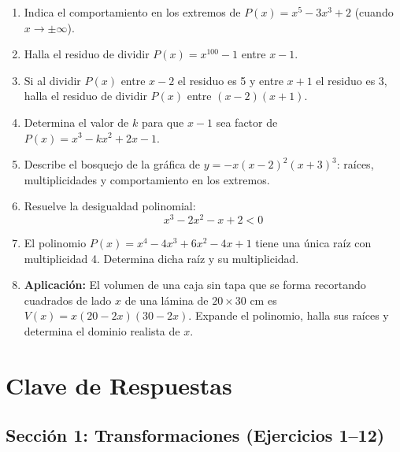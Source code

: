 \documentclass[12pt, letterpaper]{article}
\begin{document}
\begin{enumerate}[resume=ejercicios, leftmargin=*]
  \item \facil{} Indica el comportamiento en los extremos de $P(x) = x^5 - 3x^3 + 2$ (cuando $x \to \pm \infty$).

  \item \medio{} Halla el residuo de dividir $P(x) = x^{100} - 1$ entre $x - 1$.

  \item \medio{} Si al dividir $P(x)$ entre $x - 2$ el residuo es 5 y entre $x + 1$ el residuo es 3, halla el residuo de dividir $P(x)$ entre $(x - 2)(x + 1)$.

  \item \medio{} Determina el valor de $k$ para que $x - 1$ sea factor de $P(x) = x^3 - kx^2 + 2x - 1$.

  \item \dificil{} Describe el bosquejo de la gráfica de $y = -x(x - 2)^2 (x + 3)^3$: raíces, multiplicidades y comportamiento en los extremos.

  \item \dificil{} Resuelve la desigualdad polinomial:
        $$x^3 - 2x^2 - x + 2 < 0$$

  \item \muyDificil{} El polinomio $P(x) = x^4 - 4x^3 + 6x^2 - 4x + 1$ tiene una única raíz con multiplicidad 4. Determina dicha raíz y su multiplicidad.

  \item \muyDificil{} \textbf{Aplicación:} El volumen de una caja sin tapa que se forma recortando cuadrados de lado $x$ de una lámina de $20 \times 30$ cm es $V(x) = x(20 - 2x)(30 - 2x)$. Expande el polinomio, halla sus raíces y determina el dominio realista de $x$.
\end{enumerate}

\newpage

\ifmwclaves
\section{Clave de Respuestas}

\subsection*{Sección 1: Transformaciones (Ejercicios 1--12)}
\end{document}
